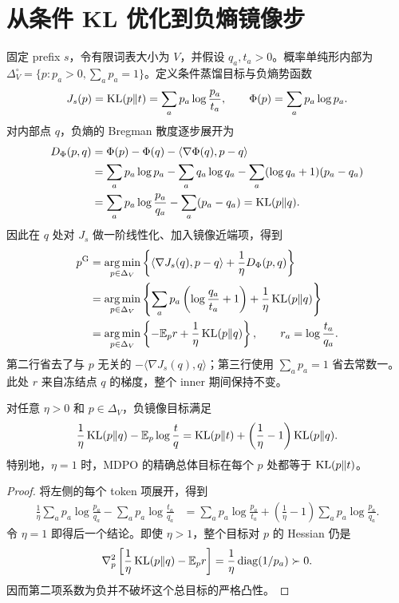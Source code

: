 \section{从条件 KL 优化到负熵镜像步}
\label{sec:foundation-origin}
固定 prefix $s$，令有限词表大小为 $V$，并假设 $q_a,t_a>0$。概率单纯形内部为 $\Delta_V^\circ=\{p:p_a>0,\sum_a p_a=1\}$。定义条件蒸馏目标与负熵势函数
\begin{equation}
J_s(p)=\operatorname{KL}(p\Vert t)=\sum_a p_a\log\frac{p_a}{t_a},\qquad
\Phi(p)=\sum_a p_a\log p_a.
\end{equation}
对内部点 $q$，负熵的 Bregman 散度逐步展开为
\begin{align}
D_\Phi(p,q)
&=\Phi(p)-\Phi(q)-\langle\nabla\Phi(q),p-q\rangle\\
&=\sum_a p_a\log p_a-\sum_a q_a\log q_a
-\sum_a(\log q_a+1)(p_a-q_a)\\
&=\sum_a p_a\log\frac{p_a}{q_a}-\sum_a(p_a-q_a)
=\operatorname{KL}(p\Vert q).
\end{align}
因此在 $q$ 处对 $J_s$ 做一阶线性化、加入镜像近端项，得到
\begin{align}
p^{\mathrm G}
&=\operatorname*{arg\,min}_{p\in\Delta_V}\left\{
\langle\nabla J_s(q),p-q\rangle+\frac1\eta D_\Phi(p,q)\right\}\\
&=\operatorname*{arg\,min}_{p\in\Delta_V}\left\{
\sum_a p_a\left(\log\frac{q_a}{t_a}+1\right)
+\frac1\eta\operatorname{KL}(p\Vert q)\right\}\\
&=\operatorname*{arg\,min}_{p\in\Delta_V}\left\{-\mathbb E_p r+\frac1\eta\operatorname{KL}(p\Vert q)\right\},
\qquad r_a=\log\frac{t_a}{q_a}.
\label{eq:foundation-md-origin}
\end{align}
第二行省去了与 $p$ 无关的 $-\langle\nabla J_s(q),q\rangle$；第三行使用 $\sum_a p_a=1$ 省去常数一。此处 $r$ 来自冻结点 $q$ 的梯度，整个 inner 期间保持不变。

\begin{proposition}
\label{prop:foundation-kl-objective}
对任意 $\eta>0$ 和 $p\in\Delta_V$，负镜像目标满足
\begin{equation}
\frac1\eta\operatorname{KL}(p\Vert q)-\mathbb E_p\log\frac tq
=\operatorname{KL}(p\Vert t)+\left(\frac1\eta-1\right)\operatorname{KL}(p\Vert q).
\label{eq:foundation-kl-mixture}
\end{equation}
特别地，$\eta=1$ 时，MDPO 的精确总体目标在每个 $p$ 处都等于 $\operatorname{KL}(p\Vert t)$。
\end{proposition}
\begin{proof}
将左侧的每个 token 项展开，得到
\begin{align}
\frac1\eta\sum_a p_a\log\frac{p_a}{q_a}
-\sum_a p_a\log\frac{t_a}{q_a}
&=\sum_a p_a\log\frac{p_a}{t_a}
+\left(\frac1\eta-1\right)\sum_a p_a\log\frac{p_a}{q_a}.
\end{align}
令 $\eta=1$ 即得后一个结论。即使 $\eta>1$，整个目标对 $p$ 的 Hessian 仍是
\begin{equation}
\nabla_p^2\left[\frac1\eta\operatorname{KL}(p\Vert q)-\mathbb E_p r\right]
=\frac1\eta\operatorname{diag}(1/p_a)\succ0.
\end{equation}
因而第二项系数为负并不破坏这个总目标的严格凸性。
\end{proof}

